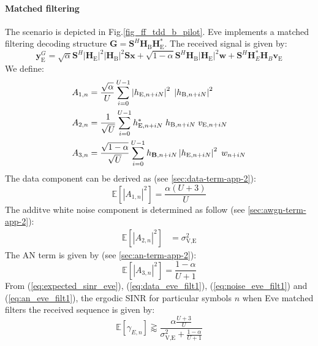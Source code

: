 \documentclass[journal,comsoc]{IEEEtran}
\newcommand{\module}[1]{\left|#1\right|}
\newcommand{\EX}[1]{\mathbb{E} \left[#1\right]}%
\newcommand{\HE}{\textbf{H}_{\text{E}}}
\newcommand{\HB}{\textbf{H}_{\text{B}}}
\newcommand{\ve}{\textbf{v}_{\text{E}}}
\newcommand{\spread}{\textbf{S}}
\newcommand{\w}{\textbf{w}}
\begin{document}
\paragraph{Matched filtering}
The scenario is depicted in Fig.\ref{fig_ff_tdd_b_pilot}. Eve implements a matched filtering decoding structure $\textbf{G} = \spread^H \HB\HE^*$. The received signal is given by:
\begin{equation}
\textbf{y}_{\text{E}}^G = \sqrt{\alpha} \spread^H \module{\HE}^2 \module{\HB}^2 \spread\textbf{x} +  \sqrt{1-\alpha} \spread^H \HB\module{\HE}^2 \w  +  \spread^H  \textbf{H}^*_E \textbf{H}_B \ve
\label{eq:rx_eve_filt1}
\end{equation}
We define: 
\begin{equation}
\begin{split}
A_{1,n} &= \frac{\sqrt{\alpha}}{U}\sum_{i=0}^{U-1}  \left|h_{\text{E}, n + iN}\right|^2 \; \left|h_{\text{B}, n + iN}\right|^2 \\
A_{2,n} &= \frac{1}{\sqrt{U}}\sum_{i=0}^{U-1} h^*_{\text{E}, n + iN} \; h_{\text{B}, n + iN} \; v_{\text{E}, n + iN}\\
A_{3,n} &=\frac{ \sqrt{1-\alpha}  }{\sqrt{U}}\sum_{i=0}^{U-1}    h_{\text{\textbf{B}}, n + iN} \left|h_{\text{E}, n + iN}\right|^2\; w_{n + iN}
\end{split}
\end{equation}
The data component can be derived as (see \ref{sec:data-term-app-2}):
\begin{equation}
\EX{|A_{1,n}|^2} =  \frac{\alpha (U+3)}{U}
\label{eq:data_eve_filt1}
\end{equation}
The additve white noise component is determined as follow  (see \ref{sec:awgn-term-app-2}):
\begin{equation}
	\begin{split}
	\EX{|A_{2,n}|^2} &= \sigma^2_{\text{V,E}}
	\end{split}
	\label{eq:noise_eve_filt1}
\end{equation}
The AN term is given by (see \ref{sec:an-term-app-2}):
\begin{equation}
	\EX{|A_{3,n}|^2} = \frac{1-\alpha}{U+1}
	\label{eq:an_eve_filt1}
\end{equation}
From (\ref{eq:expected_sinr_eve}), (\ref{eq:data_eve_filt1}), (\ref{eq:noise_eve_filt1}) and (\ref{eq:an_eve_filt1}),  the ergodic SINR for particular symbols $n$ when Eve matched filters the received sequence is given by:
\begin{equation}
\EX{\gamma_{E,n}} \gtrapprox \frac{\alpha \frac{U+3}{U}}{\sigma^2_{\text{V,E}} + \frac{1-\alpha}{U+1}}
\label{eq:sinr_eve_filt1}
\end{equation}
\end{document}
